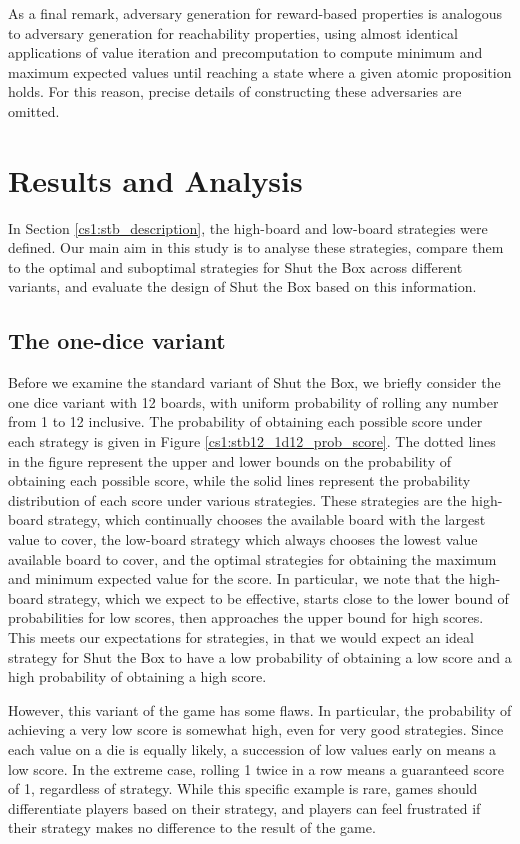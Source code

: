 As a final remark, adversary generation for reward-based properties is analogous to adversary generation for reachability properties, using almost identical applications of value iteration and precomputation to compute minimum and maximum expected values until reaching a state where a given atomic proposition holds. For this reason, precise details of constructing these adversaries are omitted.

\section{Results and Analysis}
\label{cs1:stb_results}

In Section \ref{cs1:stb_description}, the high-board and low-board strategies were defined. Our main aim in this study is to analyse these strategies, compare them to the optimal and suboptimal strategies for Shut the Box across different variants, and evaluate the design of Shut the Box based on this information.

\subsection{The one-dice variant}
\label{cs1:stb_one_dice}

Before we examine the standard variant of Shut the Box, we briefly consider the one dice variant with 12 boards, with uniform probability of rolling any number from 1 to 12 inclusive. The probability of obtaining each possible score under each strategy is given in Figure \ref{cs1:stb12_1d12_prob_score}. The dotted lines in the figure represent the upper and lower bounds on the probability of obtaining each possible score, while the solid lines represent the probability distribution of each score under various strategies. These strategies are the high-board strategy, which continually chooses the available board with the largest value to cover, the low-board strategy which always chooses the lowest value available board to cover, and the optimal strategies for obtaining the maximum and minimum expected value for the score. In particular, we note that the high-board strategy, which we expect to be effective, starts close to the lower bound of probabilities for low scores, then approaches the upper bound for high scores. This meets our expectations for strategies, in that we would expect an ideal strategy for Shut the Box to have a low probability of obtaining a low score and a high probability of obtaining a high score. 

However, this variant of the game has some flaws. In particular, the probability of achieving a very low score is somewhat high, even for very good strategies. Since each value on a die is equally likely, a succession of low values early on means a low score. In the extreme case, rolling 1 twice in a row means a guaranteed score of 1, regardless of strategy. While this specific example is rare, games should differentiate players based on their strategy, and players can feel frustrated if their strategy makes no difference to the result of the game.

